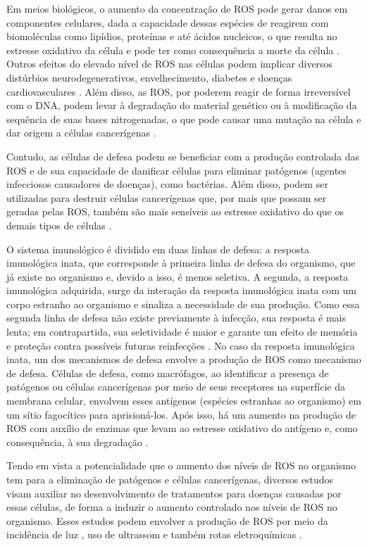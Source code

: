 Em meios biológicos, o aumento da concentração de ROS pode gerar danos em componentes celulares, dada a capacidade dessas espécies de reagirem com biomoléculas como lipídios, proteínas e até ácidos nucleicos, o que resulta no estresse oxidativo da célula e pode ter como consequência a morte da célula \cite{shafiq2021reactive}. Outros efeitos do elevado nível de ROS nas células podem implicar diversos distúrbios neurodegenerativos, envelhecimento, diabetes e doenças cardiovasculares \cite{liang2016ros}. Além disso, as ROS, por poderem reagir de forma irreversível com o DNA, podem levar à degradação do material genético ou à modificação da sequência de suas bases nitrogenadas, o que pode causar uma mutação na célula e dar origem a células cancerígenas \cite{yu2016occurrence}.

Contudo, as células de defesa podem se beneficiar com a produção controlada das ROS e de sua capacidade de danificar células para eliminar patógenos (agentes infecciosos causadores de doenças), como bactérias. Além disso, podem ser utilizadas para destruir células cancerígenas que, por mais que possam ser geradas pelas ROS, também são mais sensíveis ao estresse oxidativo do que os demais tipos de células \cite{yang2019reactive}.

O sistema imunológico é dividido em duas linhas de defesa: a resposta imunológica inata, que corresponde à primeira linha de defesa do organismo, que já existe no organismo e, devido a isso, é menos seletiva. A segunda, a resposta imunológica adquirida, surge da interação da resposta imunológica inata com um corpo estranho ao organismo e sinaliza a necessidade de sua produção. Como essa segunda linha de defesa não existe previamente à infecção, sua resposta é mais lenta; em contrapartida, sua seletividade é maior e garante um efeito de memória e proteção contra possíveis futuras reinfecções \cite{spiering2015primer,wang2024interaction}. No caso da resposta imunológica inata, um dos mecanismos de defesa envolve a produção de ROS como mecanismo de defesa. Células de defesa, como macrófagos, ao identificar a presença de patógenos ou células cancerígenas por meio de seus receptores na superfície da membrana celular, envolvem esses antígenos (espécies estranhas ao organismo) em um sítio fagocítico para aprisioná-los. Após isso, há um aumento na produção de ROS com auxílio de enzimas que levam ao estresse oxidativo do antígeno e, como consequência, à sua degradação \cite{bardaweel2018reactive,gordon2016phagocytosis}.

Tendo em vista a potencialidade que o aumento dos níveis de ROS no organismo tem para a eliminação de patógenos e células cancerígenas, diversos estudos visam auxiliar no desenvolvimento de tratamentos para doenças causadas por essas células, de forma a induzir o aumento controlado nos níveis de ROS no organismo. Esses estudos podem envolver a produção de ROS por meio da incidência de luz \cite{zeng2020cooperatively}, uso de ultrassom \cite{zhu2021rapid} e também rotas eletroquímicas \cite{liu2024simultaneous}.

